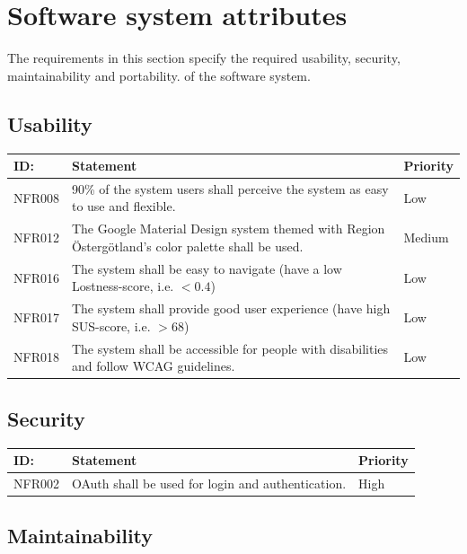 \documentclass{scrreprt}
\begin{document}
\section{Software system attributes}
The requirements in this section specify the required usability, security, maintainability and portability.
of the software system.

\subsection{Usability}

\begin{center}
\begin{tabularx}{\linewidth}{| l | X | l |}
\hline
\textbf{ID:} & \textbf{Statement} & \textbf{Priority} \\
\hline
NFR008 & 
90\% of the system users shall perceive the system as easy to use and flexible. & 
Low \\ 
\hline
NFR012 & 
The Google Material Design system themed with Region Östergötland’s color palette shall be used. & 
Medium \\ 
\hline
NFR016 & 
The system shall be easy to navigate (have a low Lostness-score, i.e. $< 0.4$) &
Low \\ 
\hline
NFR017 & 
The system shall provide good user experience (have high SUS-score, i.e. $> 68$) & 
Low \\ 
\hline
NFR018 & 
The system shall be accessible for people with disabilities and follow WCAG guidelines. &
Low \\ 
\hline
\end{tabularx}
\end{center}

\subsection{Security}

\begin{center}
\begin{tabularx}{\linewidth}{| l | X | l |}
\hline
\textbf{ID:} & \textbf{Statement} & \textbf{Priority} \\
\hline
NFR002 & 
OAuth shall be used for login and authentication. &
High \\ 
 \hline
\end{tabularx}
\end{center}

\subsection{Maintainability}
\end{document}
